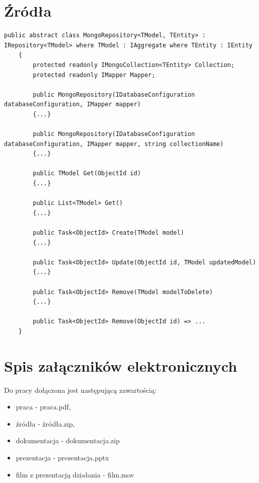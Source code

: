 \documentclass[a4paper,twoside,12pt]{book}
\begin{document}
\begin{appendices}
\chapter*{Źródła}
\begin{lstlisting}[caption={Klasa \textit{MongoRepository}}, label={lst:mongoRepository}, nolol=true]
	public abstract class MongoRepository<TModel, TEntity> : IRepository<TModel> where TModel : IAggregate where TEntity : IEntity
	{
		protected readonly IMongoCollection<TEntity> Collection;
		protected readonly IMapper Mapper;
		
		public MongoRepository(IDatabaseConfiguration databaseConfiguration, IMapper mapper)
		{...}
		
		public MongoRepository(IDatabaseConfiguration databaseConfiguration, IMapper mapper, string collectionName)
		{...}
		
		public TModel Get(ObjectId id)
		{...}
		
		public List<TModel> Get()
		{...}
		
		public Task<ObjectId> Create(TModel model)
		{...}
		
		public Task<ObjectId> Update(ObjectId id, TModel updatedModel)
		{...}
		
		public Task<ObjectId> Remove(TModel modelToDelete)
		{...}
		
		public Task<ObjectId> Remove(ObjectId id) => ...
	}
\end{lstlisting}

\chapter*{Spis załączników elektronicznych}

Do pracy dołączona jest następującą zawartością:
\begin{itemize}
\item praca - praca.pdf,
\item źródła - źródła.zip,
\item dokumentacja - dokumentacja.zip
\item prezentacja - prezentacja.pptx
\item film z prezentacją działania - film.mov
\end{itemize}

\listoffigures
	
\lstlistoflistings
	
\end{appendices}
\end{document}
